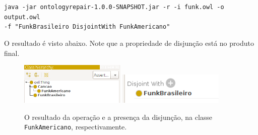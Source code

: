 \begin{small}
	\texttt{java -jar ontologyrepair-1.0.0-SNAPSHOT.jar -r -i funk.owl -o output.owl \\ -f "FunkBrasileiro DisjointWith FunkAmericano"}
\end{small}

O resultado é visto abaixo. Note que a propriedade de disjunção está no produto final.

\begin{figure}[H]
	\centering
	\includegraphics[width=0.45\textwidth]{Capitulos/Implementacao/r2.png}
	\includegraphics[width=0.45\textwidth]{Capitulos/Implementacao/r3.png}
	\caption{O resultado da operação e a presença da disjunção, na classe \texttt{FunkAmericano}, respectivamente.}
\end{figure}